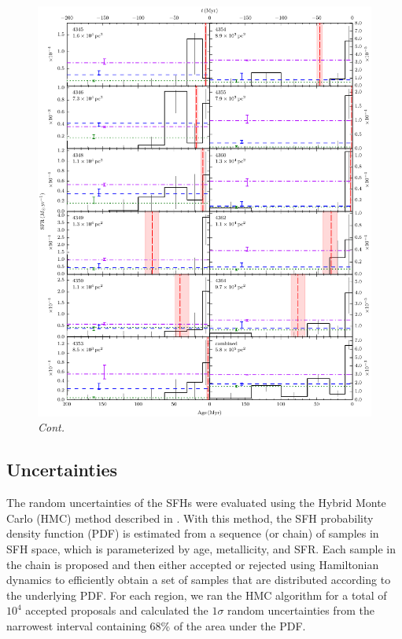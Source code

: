 \addtocounter{figure}{-1}
\begin{figure}
\begin{center}
\includegraphics[width=\textwidth]{uv_regions-figures/sfh_grid-4345-0000.pdf}
\caption{\textit{Cont.}}
\end{center}
\end{figure}






\subsection{Uncertainties}\label{uvr:sfhs.uncertainties}

The random uncertainties of the SFHs were evaluated using the Hybrid Monte
Carlo (HMC) method described in \citet{Dolphin:2013}. With this method, the SFH
probability density function (PDF) is estimated from a sequence (or chain) of
samples in SFH space, which is parameterized by age, metallicity, and SFR. Each
sample in the chain is proposed and then either accepted or rejected using
Hamiltonian dynamics to efficiently obtain a set of samples that are
distributed according to the underlying PDF. For each region, we ran the HMC
algorithm for a total of $10^4$ accepted proposals and calculated the $1\sigma$
random uncertainties from the narrowest interval containing 68\% of the area
under the PDF.

